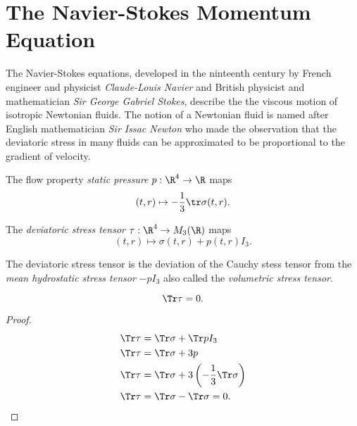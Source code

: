 \section{The Navier-Stokes Momentum Equation}
\begin{rk}
The Navier-Stokes equations, developed in the ninteenth
century by French engineer and physicist \emph{Claude-Louis Navier}
and British physicist and mathematician
\emph{Sir George Gabriel Stokes}, describe the the viscous motion
of isotropic Newtonian fluids.  The notion of a Newtonian fluid is named
after English mathematician \emph{Sir Issac Newton} who made the
observation that the deviatoric stress in many fluids can be approximated
to be proportional to the gradient of velocity.
\end{rk}

\begin{df}
    The flow property \emph{static pressure} $p:\R^4\to \R$ maps
    \begin{equation}
        (t,r)\mapsto -\frac{1}{3} \tr \sigma(t,r).
    \end{equation}
\end{df}

\begin{df}
The \emph{deviatoric stress tensor} $\tau:\R^4\to M_3(\R)$
maps
    \begin{equation}
        (t,r) \mapsto \sigma(t,r) + p(t,r) I_3.
    \end{equation}
\end{df}

\begin{rk}
The deviatoric stress tensor is the deviation of the Cauchy stess tensor
from the \emph{mean hydrostatic stress tensor} $-p I_3$ also called the 
\emph{volumetric stress tensor}.
\end{rk}

\begin{thm}
    \begin{equation}
        \Tr \tau = 0.
    \end{equation}
\end{thm}
\begin{proof}
    \begin{align}
        \Tr \tau &= \Tr \sigma + \Tr p I_3 \\
        \Tr \tau &= \Tr \sigma + 3 p \\
        \Tr \tau &= \Tr \sigma + 3 \left( -\frac{1}{3} \Tr \sigma \right) \\
        \Tr \tau &= \Tr \sigma - \Tr \sigma = 0.
    \end{align}
\end{proof}

